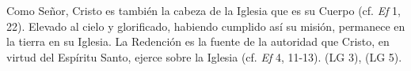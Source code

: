  Como Señor, Cristo es también la cabeza de la Iglesia que es su Cuerpo (cf. \emph{Ef} 1, 22). Elevado al cielo y glorificado, habiendo cumplido así su misión, permanece en la tierra en su Iglesia. La Redención es la fuente de la autoridad que Cristo, en virtud del Espíritu Santo, ejerce sobre la Iglesia (cf. \emph{Ef} 4, 11-13).  (LG 3),  (LG 5).